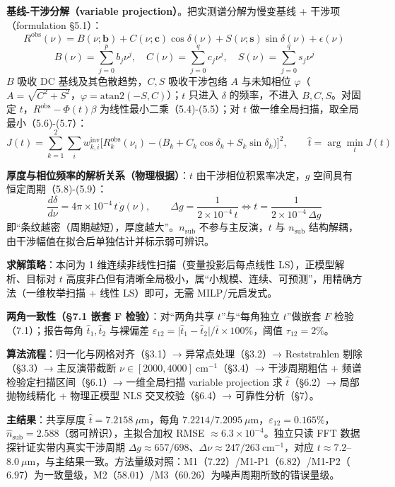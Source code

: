 \textbf{基线-干涉分解（variable projection）}。把实测谱分解为慢变基线 +
干涉项（formulation §5.1）：
\[R^{\mathrm{obs}}(\nu)=B(\nu;\mathbf b)+C(\nu;\mathbf c)\cos\delta(\nu)+S(\nu;\mathbf s)\sin\delta(\nu)+\epsilon(\nu)\]
\[B(\nu)=\sum_{j=0}^{p}b_j\nu^j,\quad C(\nu)=\sum_{j=0}^{q}c_j\nu^j,\quad S(\nu)=\sum_{j=0}^{q}s_j\nu^j\]
\(B\) 吸收 DC 基线及其色散趋势，\(C,S\) 吸收干涉包络 \(A\) 与未知相位
\(\varphi\)（\(A=\sqrt{C^2+S^2}\)，\(\varphi=\mathrm{atan2}(-S,C)\)）；\(t\)
只进入 \(\delta\) 的频率，不进入 \(B,C,S\)。对固定
\(t\)，\(R^{\mathrm{obs}}-\Phi(t)\beta\) 为线性最小二乘（5.4)-(5.5）；对
\(t\) 做一维全局扫描，取全局最小（5.6)-(5.7）：
\[J(t)=\sum_{k=1}^{2}\sum_i w^{\mathrm{inv}}_{k,i}\bigl[R^{\mathrm{obs}}_{k}(\nu_i)-\bigl(B_k+C_k\cos\delta_k+S_k\sin\delta_k\bigr)\bigr]^2,\qquad \hat t=\arg\min_{t}J(t)\]

\textbf{厚度与相位频率的解析关系（物理根据）}：\(t\)
由干涉相位积累率决定，\(g\) 空间具有恒定周期（5.8)-(5.9）：
\[\frac{d\delta}{d\nu}=4\pi\times10^{-4}\,t\,\dot g(\nu),\qquad \Delta g=\frac{1}{2\times10^{-4}\,t}\iff t=\frac{1}{2\times10^{-4}\,\Delta g}\]
即``条纹越密（周期越短），厚度越大''。\(n_{\mathrm{sub}}\)
不参与主反演，\(t\) 与 \(n_{\mathrm{sub}}\)
结构解耦，由干涉幅值在拟合后单独估计并标示弱可辨识。

\textbf{求解策略}：本问为 1 维连续非线性扫描（变量投影后每点线性
LS），正模型解析、目标对 \(t\)
高度非凸但有清晰全局极小，属``小规模、连续、可预测''，用精确方法（一维枚举扫描
+ 线性 LS）即可，无需 MILP/元启发式。

\textbf{两角一致性（§7.1 嵌套 F 检验）}：对``两角共享
\(t\)''与``每角独立 \(t\)''做嵌套 \(F\) 检验（7.1）；报告每角
\(\hat t_1,\hat t_2\) 与裸偏差
\(\varepsilon_{12}=\lvert\hat t_1-\hat t_2\rvert/\bar t\times100\%\)，阈值
\(\tau_{12}=2\%\)。

\textbf{算法流程}：归一化与网格对齐（§3.1）→ 异常点处理（§3.2）→
Reststrahlen 剔除（§3.3）→ 主反演带截断
\(\nu\in[2000,4000]\ \mathrm{cm}^{-1}\)（§3.4）→ 干涉周期粗估 +
频谱检验定扫描区间（§6.1）→ 一维全局扫描 variable projection 求
\(\hat t\)（§6.2）→ 局部抛物线精化 + 物理正模型 NLS 交叉校验（§6.4）→
可靠性分析（§7）。

\textbf{主结果}：共享厚度 \(\hat t=7.2158\ \mu\mathrm{m}\)，每角
\(7.2214/7.2095\ \mu\mathrm{m}\)，\(\varepsilon_{12}=0.165\%\)，\(\hat n_{\mathrm{sub}}=2.588\)（弱可辨识），主拟合加权
RMSE \(\approx6.3\times10^{-4}\)。独立只读 FFT
数据探针证实带内真实干涉周期
\(\Delta g\approx657/698\)、\(\Delta\nu\approx247/263\ \mathrm{cm}^{-1}\)，对应
\(t\approx7.2\)--\(8.0\ \mu\mathrm{m}\)，与主结果一致。方法量级对照：M1（\(7.22\)）/M1-P1（\(6.82\)）/M1-P2（\(6.97\)）为一致量级，M2（\(58.01\)）/M3（\(60.26\)）为噪声周期所致的错误量级。

